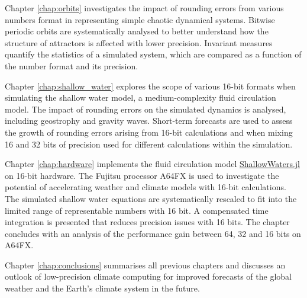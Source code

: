 Chapter \ref{chap:orbits} investigates the impact of rounding errors from various numbers format in representing simple
chaotic dynamical systems. Bitwise periodic orbits are systematically analysed to better understand how the structure
of attractors is affected with lower precision. Invariant measures quantify the statistics of a simulated system, which are
compared as a function of the number format and its precision.

Chapter \ref{chap:shallow_water} explores the scope of various 16-bit formats when simulating the shallow water model,
a medium-complexity fluid circulation model. The impact of rounding errors on the simulated dynamics is analysed,
including geostrophy and gravity waves. Short-term forecasts are used to assess the growth of rounding errors arising
from 16-bit calculations and when mixing 16 and 32 bits of precision used for different calculations within the simulation.

Chapter \ref{chap:hardware} implements the fluid circulation model
\href{https://github.com/milankl/ShallowWaters.jl}{ShallowWaters.jl} on 16-bit hardware. The Fujitsu
processor A64FX is used to investigate the potential of accelerating weather and climate models with 16-bit calculations. The
simulated shallow water equations are systematically rescaled to fit into the limited range of representable numbers
with 16 bit. A compensated time integration is presented that reduces precision issues with 16 bits. The chapter
concludes with an analysis of the performance gain between 64, 32 and 16 bits on A64FX.

Chapter \ref{chap:conclusions} summarises all previous chapters and discusses an outlook of low-precision climate
computing for improved forecasts of the global weather and the Earth's climate system in the future.
